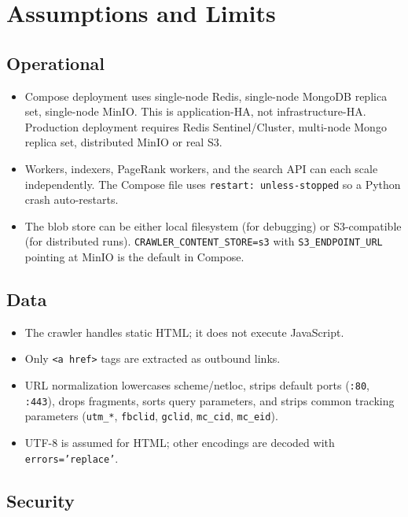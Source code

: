 \documentclass[11pt,a4paper]{article}
\newcommand{\code}[1]{\texttt{#1}}
\begin{document}
\section{Assumptions and Limits}

\subsection{Operational}

\begin{itemize}[leftmargin=1.4em]
  \item Compose deployment uses single-node Redis, single-node MongoDB replica set, single-node MinIO. This is application-HA, not infrastructure-HA. Production deployment requires Redis Sentinel/Cluster, multi-node Mongo replica set, distributed MinIO or real S3.
  \item Workers, indexers, PageRank workers, and the search API can each scale independently. The Compose file uses \code{restart: unless-stopped} so a Python crash auto-restarts.
  \item The blob store can be either local filesystem (for debugging) or S3-compatible (for distributed runs). \code{CRAWLER\_CONTENT\_STORE=s3} with \code{S3\_ENDPOINT\_URL} pointing at MinIO is the default in Compose.
\end{itemize}

\subsection{Data}

\begin{itemize}[leftmargin=1.4em]
  \item The crawler handles static HTML; it does not execute JavaScript.
  \item Only \code{<a href>} tags are extracted as outbound links.
  \item URL normalization lowercases scheme/netloc, strips default ports (\code{:80}, \code{:443}), drops fragments, sorts query parameters, and strips common tracking parameters (\code{utm\_*}, \code{fbclid}, \code{gclid}, \code{mc\_cid}, \code{mc\_eid}).
  \item UTF-8 is assumed for HTML; other encodings are decoded with \code{errors='replace'}.
\end{itemize}

\subsection{Security}
\end{document}
